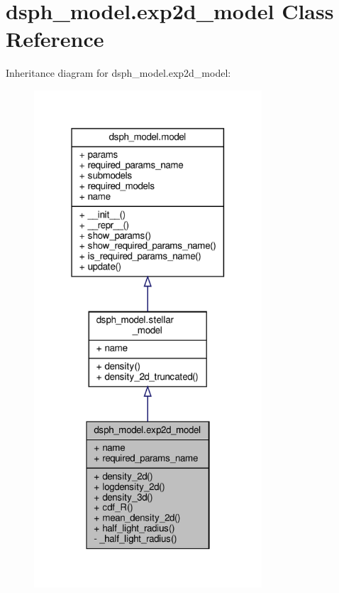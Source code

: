 \hypertarget{classdsph__model_1_1exp2d__model}{}\section{dsph\+\_\+model.\+exp2d\+\_\+model Class Reference}
\label{classdsph__model_1_1exp2d__model}


Inheritance diagram for dsph\+\_\+model.\+exp2d\+\_\+model\+:\nopagebreak
\begin{figure}[H]
\begin{center}
\leavevmode
\includegraphics[width=241pt]{d0/db2/classdsph__model_1_1exp2d__model__inherit__graph}
\end{center}
\end{figure}


